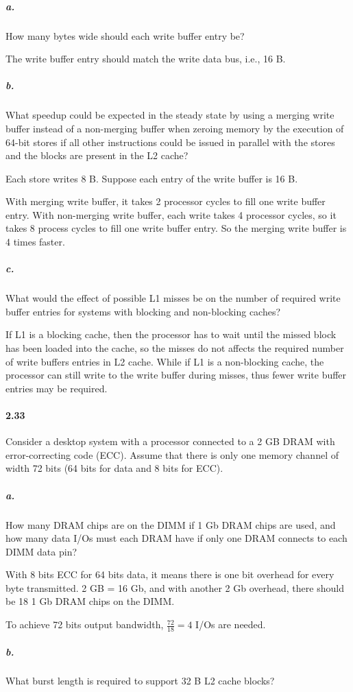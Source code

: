 \documentclass{article}
\begin{document}
\subparagraph{a.} How many bytes wide should each write buffer entry be?

The write buffer entry should match the write data bus, i.e., 16 B.

\subparagraph{b.} What speedup could be expected in the steady state by using a merging write buffer instead of a non-merging buffer when zeroing memory by the execution of 64-bit stores if all other instructions could be issued in parallel with the stores and the blocks are present in the L2 cache?

Each store writes 8 B. Suppose each entry of the write buffer is 16 B.

With merging write buffer, it takes 2 processor cycles to fill one write buffer entry. With non-merging write buffer, each write takes 4 processor cycles, so it takes 8 process cycles to fill one write buffer entry. So the merging write buffer is 4 times faster.

\subparagraph{c.} What would the effect of possible L1 misses be on the number of required write buffer entries for systems with blocking and non-blocking caches?

If L1 is a blocking cache, then the processor has to wait until the missed block has been loaded into the cache, so the misses do not affects the required number of write buffers entries in L2 cache. While if L1 is a non-blocking cache, the processor can still write to the write buffer during misses, thus fewer write buffer entries may be required.

\paragraph{2.33} Consider a desktop system with a processor connected to a 2 GB DRAM with error-correcting code (ECC). Assume that there is only one memory channel of width 72 bits (64 bits for data and 8 bits for ECC).

\subparagraph{a.} How many DRAM chips are on the DIMM if 1 Gb DRAM chips are used, and how many data I/Os must each DRAM have if only one DRAM connects to each DIMM data pin?

With 8 bits ECC for 64 bits data, it means there is one bit overhead for every byte transmitted. 2 GB = 16 Gb, and with another 2 Gb overhead, there should be 18 1 Gb DRAM chips on the DIMM.

To achieve 72 bits output bandwidth, $\frac{72}{18}=4$ I/Os are needed.

\subparagraph{b.} What burst length is required to support 32 B L2 cache blocks?
\end{document}
